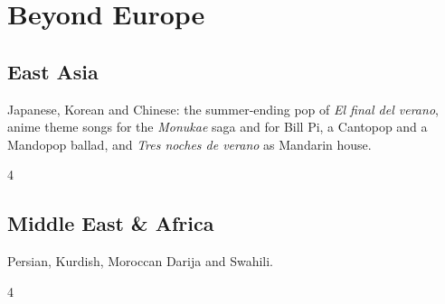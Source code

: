 \documentclass[a4paper,landscape]{memoir}
\begin{document}
\part{Beyond Europe}

\chapter{East Asia}
Japanese, Korean and Chinese: the summer-ending pop of \emph{El final del verano}, anime theme songs for the \emph{Monukae} saga and for Bill Pi, a Cantopop and a Mandopop ballad, and \emph{Tres noches de verano} as Mandarin house.
\clearpage\begin{multicols*}{4}
\end{multicols*}

\chapter{Middle East \& Africa}
Persian, Kurdish, Moroccan Darija and Swahili.
\clearpage\begin{multicols*}{4}
\end{multicols*}

\appendix

\backmatter
\printindex[songs]
\clearpage
\printindex[tags]
\end{document}
